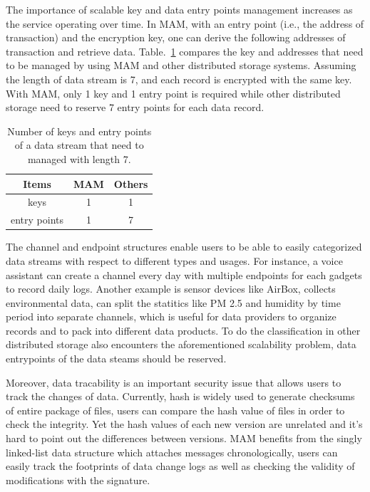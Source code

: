 \documentclass[conference]{IEEEtran}
\begin{document}
The importance of scalable key and data entry points management increases as the service operating over time. In MAM, with an entry point (i.e., the address of transaction) and the encryption key, one can derive the following addresses of transaction and retrieve data. Table.~\ref{tab:mam_scalability} compares the key and addresses that need to be managed by using MAM and other distributed storage systems. Assuming the length of data stream is 7, and each record is encrypted with the same key. With MAM, only 1 key and 1 entry point is required while other distributed storage need to reserve 7 entry points for each data record.

\begin{table}[htbp]
	\caption{Number of keys and entry points of a data stream that need to managed with length 7.}
	\label{tab:mam_scalability}
	\begin{center}
	\begin{tabular}{|c|c|c|}
	\hline
		\textbf{Items} & \textbf{MAM} & \textbf{Others} \\ 
		\hline
		keys & 1 & 1 \\ 
		\hline
		entry points & 1 & 7 \\ 
		\hline
	\end{tabular}
	\end{center}
\end{table}

The channel and endpoint structures enable users to be able to easily categorized data streams with respect to different types and usages. For instance, a voice assistant can create a channel every day with multiple endpoints for each gadgets to record daily logs. Another example is sensor devices like AirBox\cite{LASS}, collects environmental data, can split the statitics like PM 2.5 and humidity by time period into separate channels, which is useful for data providers to organize records and to pack into different data products. To do the classification in other distributed storage also encounters the aforementioned scalability problem, data entrypoints of the data steams should be reserved.    

Moreover, data tracability is an important security issue that allows users to track the changes of data. Currently, hash is widely used to generate checksums of entire package of files, users can compare the hash value of files in order to check the integrity. Yet the hash values of each new version are unrelated and it's hard to point out the differences between versions. MAM benefits from the singly linked-list data structure which attaches messages chronologically, users can easily track the footprints of data change logs as well as checking the validity of modifications with the signature.
\end{document}
